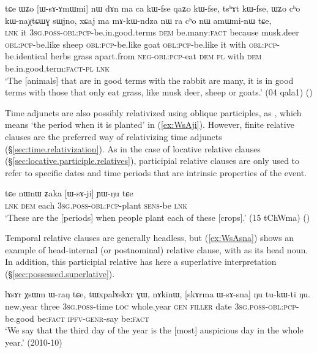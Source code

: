 \begin{exe}
   \ex \label{ex:WsAmWmi}
 \gll  tɕe ɯʑo [ɯ-sɤ-ɤmɯmi] nɯ dɤn ma ca kɯ-fse qaʑo kɯ-fse, tsʰɤt kɯ-fse,  ɯʑo cʰo kɯ-naχtɕɯɣ sɯjno, xɕaj ma mɤ-kɯ-ndza nɯ ra cʰo nɯ amɯmi-nɯ tɕe, \\
\textsc{lnk} it \textsc{3sg}.\textsc{poss}-\textsc{obl}:\textsc{pcp}-be.in.good.terms \textsc{dem} be.many:\textsc{fact} because musk.deer \textsc{obl}:\textsc{pcp}-be.like sheep \textsc{obl}:\textsc{pcp}-be.like goat  \textsc{obl}:\textsc{pcp}-be.like it with  \textsc{obl}:\textsc{pcp}-be.identical herbs grass apart.from \textsc{neg}-\textsc{obl}:\textsc{pcp}-eat \textsc{dem} \textsc{pl} with \textsc{dem} be.in.good.term:\textsc{fact}-\textsc{pl} \textsc{lnk} \\
\glt `The [animals] that are in good terms with the rabbit are many, it is in good terms with those that only eat grass, like musk deer, sheep or goats.' (04 qala1)
()
\end{exe}

Time adjuncts are also possibly relativized using oblique participles, as , which means `the period when it is planted' in (\ref{ex:WsAji}). However, finite relative clauses are the preferred way of relativizing time adjuncts (§\ref{sec:time.relativization}). As in the case of locative relative clauses (§\ref{sec:locative.participle.relatives}), participial relative clauses are only used to refer to specific dates and time periods that are intrinsic properties of the event.

\begin{exe}
   \ex \label{ex:WsAji}
   \gll    tɕe nɯnɯ ʑaka [ɯ-sɤ-ji] ɲɯ-ŋu tɕe \\
   \textsc{lnk} \textsc{dem} each \textsc{3sg}.\textsc{poss}-\textsc{obl}:\textsc{pcp}-plant \textsc{sens}-be \textsc{lnk}\\
\glt `These are the [periods] when people plant each of these [crops].' (15 tChWma)
()
\end{exe}

Temporal relative clauses are generally headless, but (\ref{ex:WsAsna}) shows an example of head-internal (or postnominal) relative clause, with  as its head noun. In addition, this participial relative has here a superlative interpretation (§\ref{sec:possessed.superlative}).

\begin{exe}
   \ex \label{ex:WsAsna}
   \gll    lɤsɤr χsɯm ɯ-raŋ tɕe, tɯxpalɤskɤr ɣɯ, nɤkinɯ, [skɤrma ɯ-sɤ-sna] ŋu tu-kɯ-ti ŋu. \\
   new.year three \textsc{3sg}.\textsc{poss}-time \textsc{loc} whole.year \textsc{gen} \textsc{filler} date \textsc{3sg}.\textsc{poss}-\textsc{obl}:\textsc{pcp}-be.good be:\textsc{fact} \textsc{ipfv}-\textsc{genr}-say be:\textsc{fact} \\
\glt `We say that the third day of the year is the [most] auspicious day in the whole year.' (2010-10)
\end{exe}

